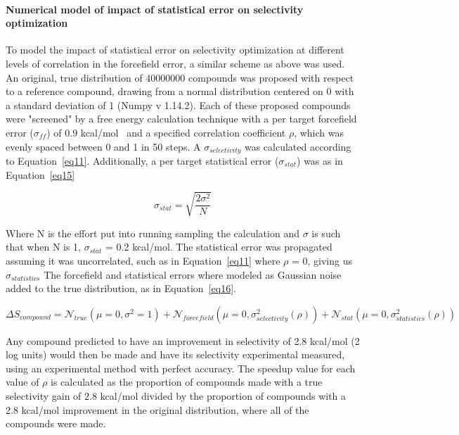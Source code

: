 \documentclass[9pt,lineno]{elife-modified} %
\begin{document}
\paragraph{Numerical model of impact of statistical error on selectivity optimization}
To model the impact of statistical error on selectivity optimization at different levels of correlation in the forcefield error, a similar scheme as above was used. An original, true distribution of 40000000 compounds was proposed with respect to a reference compound, drawing from a normal distribution centered on 0 with a standard deviation of 1 (Numpy v 1.14.2). Each of these proposed compounds were "screened" by a free energy calculation technique with a per target forcefield error ($\sigma_{ff}$) of 0.9 kcal/mol~\citep{Harder2016-zn} and a specified correlation coefficient $\rho$, which was evenly spaced between 0 and 1 in 50 steps.  A $\sigma_{selectivity}$ was calculated according to Equation~\ref{eq11}. Additionally, a per target statistical error ($\sigma_{stat}$) was as in Equation~\ref{eq15}

\begin{equation}\label{eq15}
\sigma_{stat} = \sqrt{\frac{2\sigma^2}{N}}
\end{equation}

Where N is the effort put into running sampling the calculation and $\sigma$ is such that when N is 1, $\sigma_{stat}$ = 0.2 kcal/mol. The statistical error was propagated assuming it was uncorrelated, such as in Equation~\ref{eq11} where $\rho$ = 0, giving us $\sigma_{statistics}$ The forcefield and statistical errors where modeled as Gaussian noise added to the true distribution, as in Equation~\ref{eq16}. 
 
 \begin{equation}\label{eq16}
 \Delta S_{compound} = \mathcal{N}_{true}(\mu =0, \sigma^2 = 1) + \mathcal{N}_{forcefield}(\mu =0, \sigma_{selectivity}^2(\rho)) + \mathcal{N}_{stat}(\mu =0, \sigma_{statistics}^2(\rho))
 \end{equation}
 
 Any compound predicted to have an improvement in selectivity of 2.8 kcal/mol (2 log units) would then be made and have its selectivity experimental measured, using an experimental method with perfect accuracy. The speedup value for each value of $\rho$ is calculated as the proportion of compounds made with a true selectivity gain of 2.8 kcal/mol divided by the proportion of compounds with a 2.8 kcal/mol improvement in the original distribution, where all of the compounds were made.
 
\end{document}
